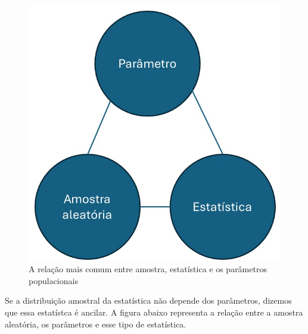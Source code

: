 \documentclass[
  letterpaper,
  DIV=11,
  numbers=noendperiod]{scrartcl}
\begin{document}
\begin{figure}

{\centering \includegraphics{fig_stat_geral.jpg}

}

\caption{A relação mais comum entre amostra, estatística e os parâmetros
populacionais}

\end{figure}%

Se a distribuição amostral da estatística não depende dos parâmetros,
dizemos que essa estatístca é ancilar. A figura abaixo representa a
relação entre a amostra aleatória, os parâmetros e esse tipo de
estatística.
\end{document}
